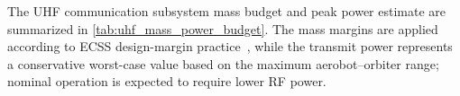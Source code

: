 The UHF communication subsystem mass budget and peak power estimate are summarized in \autoref{tab:uhf_mass_power_budget}. The mass margins are applied according to ECSS design-margin practice~\cite{ecss2010_design_margins}, while the transmit power represents a conservative worst-case value based on the maximum aerobot--orbiter range; nominal operation is expected to require lower RF power.

